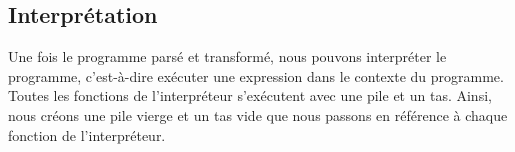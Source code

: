 \documentclass{rapportECL}
\begin{document}









\subsection{Interprétation}

Une fois le programme parsé et transformé, nous pouvons interpréter le programme, c'est-à-dire exécuter une expression dans le 
contexte du programme. Toutes les fonctions de l'interpréteur s'exécutent avec une pile et un tas. Ainsi, nous créons une pile vierge
et un tas vide que nous passons en référence à chaque fonction de l'interpréteur.
\end{document}
